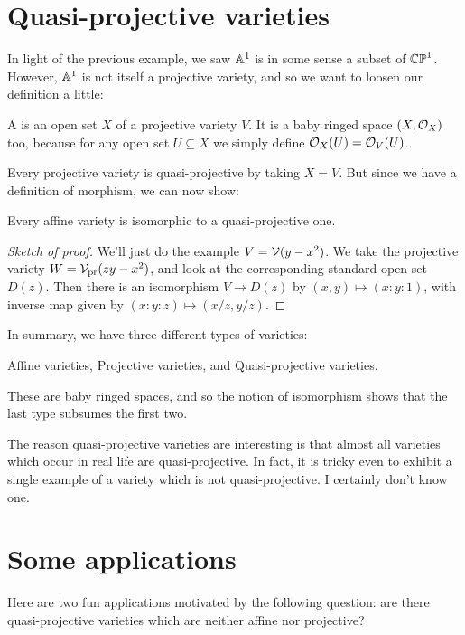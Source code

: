 \section{Quasi-projective varieties}
In light of the previous example, we saw $\mathbb A^1$ is in some
sense a subset of $\mathbb{CP}^1$.
However, $\mathbb A^1$ is not itself a projective variety,
and so we want to loosen our definition a little:
\begin{definition}
	A  is
	an open set $X$ of a projective variety $V$.
	It is a baby ringed space $(X, \mathcal O_X)$ too,
	because for any open set $U \subseteq X$
	we simply define $\mathcal O_X(U) = \mathcal O_V(U)$.
\end{definition}
Every projective variety is quasi-projective by taking $X = V$.
But since we have a definition of morphism, we can now show:
\begin{proposition}
	Every affine variety is isomorphic to a quasi-projective one.
\end{proposition}
\begin{proof}
	[Sketch of proof]
	We'll just do the example $V = \mathcal V(y-x^2)$.
	We take the projective variety $W = \mathcal V_{\text{pr}}(zy-x^2)$,
	and look at the corresponding standard open set $D(z)$.
	Then there is an isomorphism $V \to D(z)$ by $(x,y) \mapsto (x:y:1)$,
	with inverse map given by $(x:y:z) \mapsto (x/z, y/z)$.
\end{proof}

In summary, we have three different types of varieties:
\begin{itemize}
	\ii Affine varieties,
	\ii Projective varieties, and
	\ii Quasi-projective varieties.
\end{itemize}
These are baby ringed spaces, and so the notion of isomorphism
shows that the last type subsumes the first two.

The reason quasi-projective varieties are interesting is that
almost all varieties which occur in real life are quasi-projective.
In fact, it is tricky even to exhibit a single example
of a variety which is not quasi-projective.
I certainly don't know one.

\section{Some applications}
Here are two fun applications motivated by the following question:
are there quasi-projective varieties which are neither affine nor projective?

